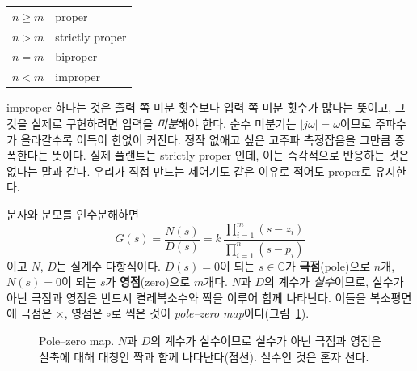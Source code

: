 \documentclass[11pt]{article}
\begin{document}
\begin{center}\small
\begin{tabular}{@{}ll@{}}
\toprule
$n \ge m$ & proper\\
$n > m$   & strictly proper\\
$n = m$   & biproper\\
$n < m$   & improper\\
\bottomrule
\end{tabular}
\end{center}

\begin{remark}
improper 하다는 것은 출력 쪽 미분 횟수보다 입력 쪽 미분 횟수가 많다는 뜻이고,
그것을 실제로 구현하려면 입력을 \emph{미분}해야 한다. 순수 미분기는
$|j\omega|=\omega$이므로 주파수가 올라갈수록 이득이 한없이 커진다. 정작 없애고
싶은 고주파 측정잡음을 그만큼 증폭한다는 뜻이다. 실제 플랜트는 strictly proper
인데, 이는 즉각적으로 반응하는 것은 없다는 말과 같다. 우리가 직접 만드는
제어기도 같은 이유로 적어도 proper로 유지한다.
\end{remark}

분자와 분모를 인수분해하면
\begin{equation}\label{eq:factored}
   G(s) = \frac{N(s)}{D(s)}
        = k\,\frac{\prod_{i=1}^{m}(s-z_i)}{\prod_{i=1}^{n}(s-p_i)}
\end{equation}
이고 $N$, $D$는 실계수 다항식이다. $D(s)=0$이 되는 $s\in\mathbb{C}$가
\textbf{극점}(pole)으로 $n$개, $N(s)=0$이 되는 $s$가 \textbf{영점}(zero)으로
$m$개다. $N$과 $D$의 계수가 \emph{실수}이므로, 실수가 아닌 극점과 영점은 반드시
켤레복소수와 짝을 이루어 함께 나타난다. 이들을 복소평면에 극점은 $\times$,
영점은 $\circ$로 찍은 것이 \emph{pole--zero map}이다(그림~\ref{fig:pzmap}).

\begin{figure}[htb]
\centering
{}
\caption{Pole--zero map. $N$과 $D$의 계수가 실수이므로 실수가 아닌 극점과 영점은
실축에 대해 대칭인 짝과 함께 나타난다(점선). 실수인 것은 혼자 선다.}
\label{fig:pzmap}
\end{figure}
\end{document}
